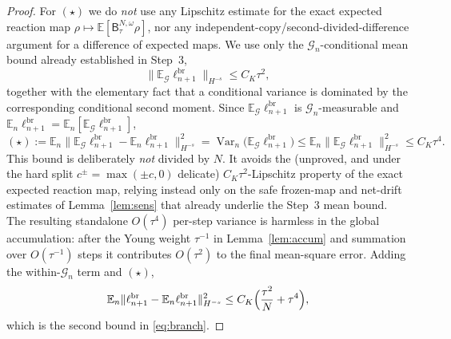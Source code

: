 \documentclass[a4paper,fleqn]{cas-sc}
\theoremstyle{definition}
\theoremstyle{remark}
\begin{document}
\begin{proof}
For $(\star)$ we do \emph{not} use any Lipschitz estimate for the exact expected
reaction map $\rho\mapsto\mathbb E[\mathsf B^{N,\omega}_\tau\rho]$, nor any
independent-copy/second-divided-difference argument for a difference of expected
maps. We use only the $\mathcal G_n$-conditional mean bound already established in
Step~3,
\[
\|\mathbb E_{\mathcal G}\ell^{\mathrm{br}}_{n+1}\|_{H^{-s}}\le C_K\tau^2 ,
\]
together with the elementary fact that a conditional variance is dominated by the
corresponding conditional second moment. Since $\mathbb E_{\mathcal G}\ell^{\mathrm{br}}_{n+1}$
is $\mathcal G_n$-measurable and $\mathbb E_n\ell^{\mathrm{br}}_{n+1}
=\mathbb E_n[\mathbb E_{\mathcal G}\ell^{\mathrm{br}}_{n+1}]$,
\[
(\star)
:=\mathbb E_n\bigl\|\mathbb E_{\mathcal G}\ell^{\mathrm{br}}_{n+1}-\mathbb E_n\ell^{\mathrm{br}}_{n+1}\bigr\|_{H^{-s}}^2
=\operatorname{Var}_n\bigl(\mathbb E_{\mathcal G}\ell^{\mathrm{br}}_{n+1}\bigr)
\le\mathbb E_n\bigl\|\mathbb E_{\mathcal G}\ell^{\mathrm{br}}_{n+1}\bigr\|_{H^{-s}}^2
\le C_K\tau^4 .
\]
This bound is deliberately \emph{not} divided by $N$. It avoids the (unproved, and
under the hard split $c^\pm=\max(\pm c,0)$ delicate) $C_K\tau^2$-Lipschitz property of
the exact expected reaction map, relying instead only on the safe frozen-map and
net-drift estimates of Lemma~\ref{lem:sens} that already underlie the Step~3 mean
bound. The resulting standalone $O(\tau^4)$ per-step variance is harmless in the
global accumulation: after the Young weight $\tau^{-1}$ in Lemma~\ref{lem:accum} and
summation over $O(\tau^{-1})$ steps it contributes $O(\tau^2)$ to the final
mean-square error. Adding the within-$\mathcal G_n$ term and $(\star)$,
\[
\mathbb E_n\|\ell^{\mathrm{br}}_{n+1}-\mathbb E_n\ell^{\mathrm{br}}_{n+1}\|_{H^{-s}}^2
\le C_K\Bigl(\frac{\tau^2}{N}+\tau^4\Bigr),
\]
which is the second bound in \eqref{eq:branch}.
\end{proof}
\end{document}
